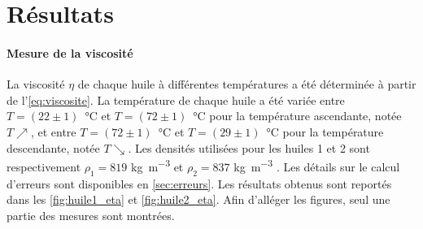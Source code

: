 \section{Résultats}

\paragraph{Mesure de la viscosité} La viscosité \(\eta\) de chaque huile à différentes températures a été déterminée à partir de l'\autoref{eq:viscosite}. La température de chaque huile a été variée entre \mbox{\(T=(22 \pm 1)\) \si{\celsius}} et \mbox{\(T=(72 \pm 1)\) \si{\celsius}} pour la température ascendante, notée \(T\nearrow\), et entre \mbox{\(T=(72 \pm 1)\) \si{\celsius}} et \mbox{\(T=(29 \pm 1)\) \si{\celsius}} pour la température descendante, notée \(T\searrow\). Les densités utilisées pour les huiles 1 et 2 sont respectivement \(\rho_1 = 819\) \si{\kilo\gram\per\cubic\meter} et \(\rho_2 = 837\) \si{\kilo\gram\per\cubic\meter} \cite{val_ref}. Les détails sur le calcul d'erreurs sont disponibles en \autoref{sec:erreurs}. Les résultats obtenus sont reportés dans les \autoref{fig:huile1_eta} et \autoref{fig:huile2_eta}. Afin d'alléger les figures, seul une partie des mesures sont montrées.

